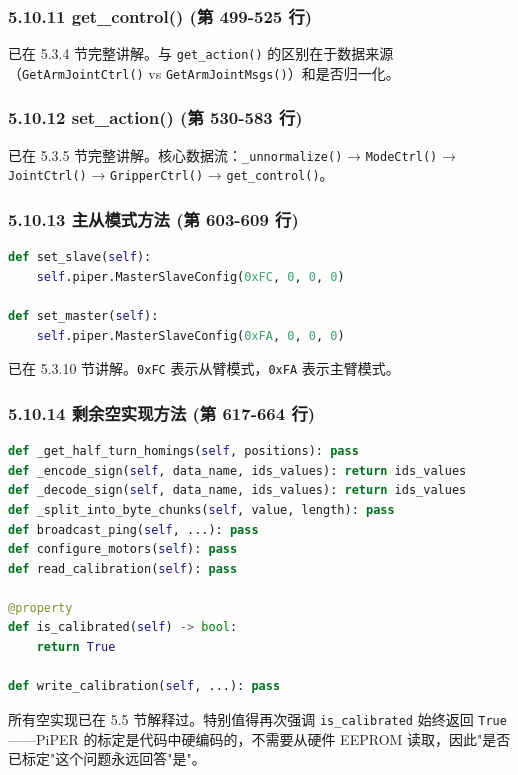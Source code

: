 \documentclass[UTF8,a4paper,11pt]{ctexart}
\begin{document}
{\subsubsection{5.10.11 get_control() (第 499-525 行)}

已在 5.3.4 节完整讲解。与 \texttt{get_action()} 的区别在于数据来源（\texttt{GetArmJointCtrl()} vs \texttt{GetArmJointMsgs()}）和是否归一化。

\subsubsection{5.10.12 set_action() (第 530-583 行)}

已在 5.3.5 节完整讲解。核心数据流：\texttt{_unnormalize()} → \texttt{ModeCtrl()} → \texttt{JointCtrl()} → \texttt{GripperCtrl()} → \texttt{get_control()}。

\subsubsection{5.10.13 主从模式方法 (第 603-609 行)}

\begin{lstlisting}[language=python]
def set_slave(self):
    self.piper.MasterSlaveConfig(0xFC, 0, 0, 0)

def set_master(self):
    self.piper.MasterSlaveConfig(0xFA, 0, 0, 0)
\end{lstlisting}

已在 5.3.10 节讲解。\texttt{0xFC} 表示从臂模式，\texttt{0xFA} 表示主臂模式。

\subsubsection{5.10.14 剩余空实现方法 (第 617-664 行)}

\begin{lstlisting}[language=python]
def _get_half_turn_homings(self, positions): pass
def _encode_sign(self, data_name, ids_values): return ids_values
def _decode_sign(self, data_name, ids_values): return ids_values
def _split_into_byte_chunks(self, value, length): pass
def broadcast_ping(self, ...): pass
def configure_motors(self): pass
def read_calibration(self): pass

@property
def is_calibrated(self) -> bool:
    return True

def write_calibration(self, ...): pass
\end{lstlisting}

所有空实现已在 5.5 节解释过。特别值得再次强调 \texttt{is_calibrated} 始终返回 \texttt{True}——PiPER 的标定是代码中硬编码的，不需要从硬件 EEPROM 读取，因此"是否已标定"这个问题永远回答"是"。

}
\end{document}
